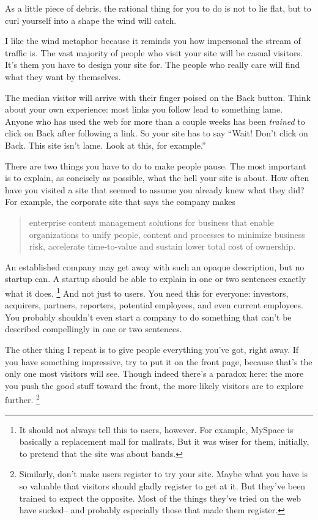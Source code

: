 \documentclass[12pt]{book}
\begin{document}
As a little piece of debris, the rational thing for you to do is not to
lie flat, but to curl yourself into a shape the wind will catch.

I like the wind metaphor because it reminds you how impersonal the
stream of traffic is. The vast majority of people who visit your site
will be casual visitors. It's them you have to design your site for. The
people who really care will find what they want by themselves.

The median visitor will arrive with their finger poised on the Back
button. Think about your own experience: most links you follow lead to
something lame. Anyone who has used the web for more than a couple weeks
has been \emph{trained} to click on Back after following a link. So your
site has to say ``Wait! Don't click on Back. This site isn't lame. Look
at this, for example.''

There are two things you have to do to make people pause. The most
important is to explain, as concisely as possible, what the hell your
site is about. How often have you visited a site that seemed to assume
you already knew what they did? For example, the corporate site that
says the company makes

\begin{quote}
enterprise content management solutions for business that enable
organizations to unify people, content and processes to minimize
business risk, accelerate time-to-value and sustain lower total cost of
ownership.
\end{quote}

An established company may get away with such an opaque description, but
no startup can. A startup should be able to explain in one or two
sentences exactly what it does. \footnote{It should not always tell this to users, however. For example,
MySpace is basically a replacement mall for mallrats. But it was wiser
for them, initially, to pretend that the site was about bands.} And not just to
users. You need this for everyone: investors, acquirers, partners,
reporters, potential employees, and even current employees. You probably
shouldn't even start a company to do something that can't be described
compellingly in one or two sentences.

The other thing I repeat is to give people everything you've got, right
away. If you have something impressive, try to put it on the front page,
because that's the only one most visitors will see. Though indeed
there's a paradox here: the more you push the good stuff toward the
front, the more likely visitors are to explore further.
\footnote{Similarly, don't make users register to try your site. Maybe
what you have is so valuable that visitors should gladly register to get
at it. But they've been trained to expect the opposite. Most of the
things they've tried on the web have sucked-- and probably especially
those that made them register.}
\end{document}
